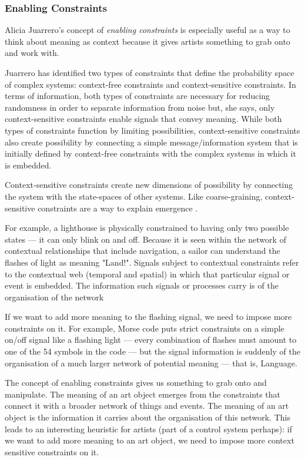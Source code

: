 \documentclass[letterpaper]{article}
\begin{document}
    \subsubsection{Enabling Constraints}

    Alicia Juarrero's concept of \emph{enabling constraints} is especially useful as a way to think about meaning as context because it gives artists something to grab onto and work with.
    
    Juarrero has identified two types of constraints that define the probability space of complex systems: context-free constraints and context-sensitive constraints. In terms of information, both types of constraints are necessary for reducing randomness in order to separate information from noise but, she says, only context-sensitive constraints enable signals that convey meaning. While both types of constraints function by limiting possibilities, context-sensitive constraints also create possibility by connecting a simple message/information system that is initially defined by context-free constraints with the complex systems in which it is embedded.
    
    Context-sensitive constraints create new dimensions of possibility by connecting the system with the state-spaces of other systems. Like coarse-graining, context-sensitive constraints are a way to explain emergence \citep[p.193]{JuarreroThSlfOrgnstnOfIntntnlActn2004} \citep[p.240]{JuarreroCsltyAsCnstrnt1998}.

    For example, a lighthouse is physically constrained to having only two possible states — it can only blink on and off. Because it is seen within the network of contextual relationships that include navigation, a sailor can understand the flashes of light as meaning "Land!". Signals subject to contextual constraints refer to the contextual web (temporal and spatial) in which that particular signal or event is embedded. The information such signals or processes carry is of the organisation of the network \citep[p.237]{JuarreroCsltyAsCnstrnt1998}
    
    If we want to add more meaning to the flashing signal, we need to impose more constraints on it. For example, Morse code puts strict constraints on a simple on/off signal like a flashing light — every combination of flashes must amount to one of the 54 symbols in the code — but the signal information is suddenly of the organisation of a much larger network of potential meaning — that is, Language.

    The concept of enabling constraints gives us something to grab onto and manipulate. The meaning of an art object emerges from the constraints that connect it with a broader network of things and events. The meaning of an art object is the information it carries about the organisation of this network. This leads to an interesting heuristic for artists (part of a control system perhaps): if we want to add more meaning to an art object, we need to impose more context sensitive constraints on it.
\end{document}
